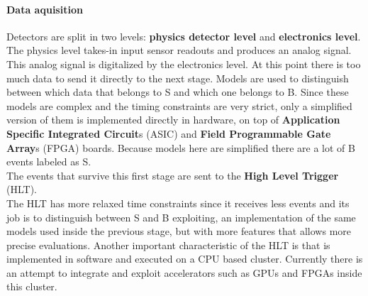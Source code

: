 \paragraph{Data aquisition}
Detectors are split in two levels: \textbf{physics detector level} and \textbf{electronics level}. The physics level takes-in input sensor readouts and produces an analog signal. This analog signal is digitalized by the electronics level. At this point there is too much data to send it directly to the next stage. Models are used to distinguish between which data that belongs to S and which one belongs to B. Since these models are complex and the timing constraints are very strict, only a simplified version of them is implemented directly in hardware, on top of \textbf{Application Specific Integrated Circuit}s (ASIC) and \textbf{Field Programmable Gate Array}s (FPGA) boards. Because models here are simplified there are a lot of B events labeled as S. \\
The events that survive this first stage are sent to the \textbf{High Level Trigger} (HLT).\\
The HLT has more relaxed time constraints since it receives less events and its job is to distinguish between S and B exploiting, an implementation of the same models used inside the previous stage, but with more features that allows more precise evaluations. Another important characteristic of the HLT is that is implemented in software and executed on a CPU based cluster. Currently there is an attempt to integrate and exploit accelerators such as GPUs and FPGAs inside this cluster.
